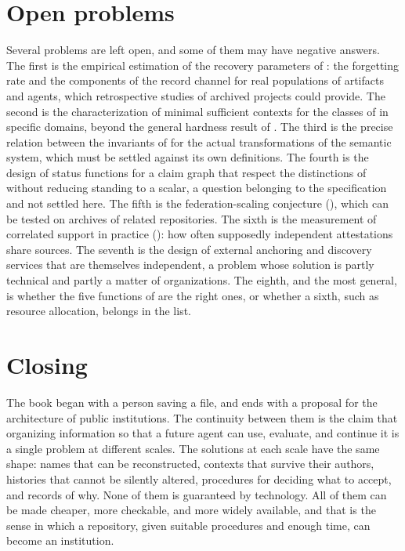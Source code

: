 \documentclass[11pt,twoside,openright]{book}
\theoremstyle{plain}
\theoremstyle{definition}
\theoremstyle{remark}
\begin{document}
\section{Open problems}

Several problems are left open, and some of them may have negative answers. The first is the empirical estimation of the recovery parameters of : the forgetting rate and the components of the record channel for real populations of artifacts and agents, which retrospective studies of archived projects could provide. The second is the characterization of minimal sufficient contexts for the classes of  in specific domains, beyond the general hardness result of . The third is the precise relation between the invariants of  for the actual transformations of the semantic system, which must be settled against its own definitions. The fourth is the design of status functions for a claim graph that respect the distinctions of  without reducing standing to a scalar, a question belonging to the specification and not settled here. The fifth is the federation-scaling conjecture (), which can be tested on archives of related repositories. The sixth is the measurement of correlated support in practice (): how often supposedly independent attestations share sources. The seventh is the design of external anchoring and discovery services that are themselves independent, a problem whose solution is partly technical and partly a matter of organizations. The eighth, and the most general, is whether the five functions of  are the right ones, or whether a sixth, such as resource allocation, belongs in the list.

\section{Closing}

The book began with a person saving a file, and ends with a proposal for the architecture of public institutions. The continuity between them is the claim that organizing information so that a future agent can use, evaluate, and continue it is a single problem at different scales. The solutions at each scale have the same shape: names that can be reconstructed, contexts that survive their authors, histories that cannot be silently altered, procedures for deciding what to accept, and records of why. None of them is guaranteed by technology. All of them can be made cheaper, more checkable, and more widely available, and that is the sense in which a repository, given suitable procedures and enough time, can become an institution.
\end{document}
